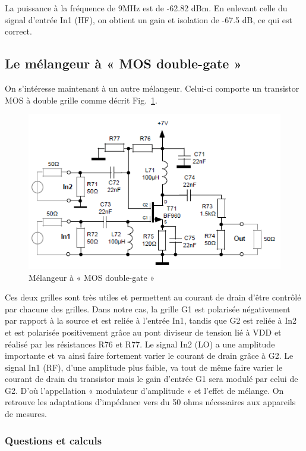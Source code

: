 \documentclass{article}
\begin{document}
La puissance à la fréquence de 9MHz est de -62.82 dBm. En enlevant celle du signal d'entrée In1 (HF), on obtient un gain et isolation de -67.5 dB, ce qui est correct.


\subsection{Le mélangeur à « MOS double-gate »}

On s'intéresse maintenant à un autre mélangeur. Celui-ci comporte un transistor MOS à double grille comme décrit Fig.~\ref{fig:schema_melangeur_mosdoublegate}.\\
\begin{figure}[h!]
	\centering
	\includegraphics[width=.7\textwidth]{schema_melangeur_mosdoublegate}
	\caption{Mélangeur à « MOS double-gate »}
	\label{fig:schema_melangeur_mosdoublegate}
\end{figure}

Ces deux grilles sont très utiles et permettent au courant de drain d'être contrôlé par chacune des grilles. Dans notre cas, la grille G1 est polarisée négativement par rapport à la source et est reliée à l'entrée In1, tandis que G2 est reliée à In2 et est polarisée positivement grâce au pont diviseur de tension lié à VDD et réalisé par les résistances R76 et R77.
Le signal In2 (LO) a une amplitude importante et va ainsi faire fortement varier le courant de drain grâce à G2. Le signal In1 (RF), d'une amplitude plus faible, va tout de même faire varier le courant de drain du transistor mais le gain d'entrée G1 sera modulé par celui de G2. D'où l'appellation « modulateur d'amplitude » et l'effet de mélange.
On retrouve les adaptations d'impédance vers du 50 ohms nécessaires aux appareils de mesures.


\subsubsection{Questions et calculs}
\end{document}
